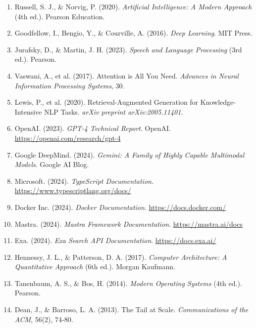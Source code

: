 \documentclass[12pt,a4paper]{article}
\begin{document}
\begin{enumerate}
    \item Russell, S. J., \& Norvig, P. (2020). \textit{Artificial Intelligence: A Modern Approach} (4th ed.). Pearson Education.

    \item Goodfellow, I., Bengio, Y., \& Courville, A. (2016). \textit{Deep Learning}. MIT Press.

    \item Jurafsky, D., \& Martin, J. H. (2023). \textit{Speech and Language Processing} (3rd ed.). Pearson.

    \item Vaswani, A., et al. (2017). Attention is All You Need. \textit{Advances in Neural Information Processing Systems}, 30.

    \item Lewis, P., et al. (2020). Retrieval-Augmented Generation for Knowledge-Intensive NLP Tasks. \textit{arXiv preprint arXiv:2005.11401}.

    \item OpenAI. (2023). \textit{GPT-4 Technical Report}. OpenAI. \url{https://openai.com/research/gpt-4}

    \item Google DeepMind. (2024). \textit{Gemini: A Family of Highly Capable Multimodal Models}. Google AI Blog.

    \item Microsoft. (2024). \textit{TypeScript Documentation}. \url{https://www.typescriptlang.org/docs/}

    \item Docker Inc. (2024). \textit{Docker Documentation}. \url{https://docs.docker.com/}

    \item Mastra. (2024). \textit{Mastra Framework Documentation}. \url{https://mastra.ai/docs}

    \item Exa. (2024). \textit{Exa Search API Documentation}. \url{https://docs.exa.ai/}

    \item Hennessy, J. L., \& Patterson, D. A. (2017). \textit{Computer Architecture: A Quantitative Approach} (6th ed.). Morgan Kaufmann.

    \item Tanenbaum, A. S., \& Bos, H. (2014). \textit{Modern Operating Systems} (4th ed.). Pearson.

    \item Dean, J., \& Barroso, L. A. (2013). The Tail at Scale. \textit{Communications of the ACM}, 56(2), 74-80.


\end{enumerate}
\end{document}
